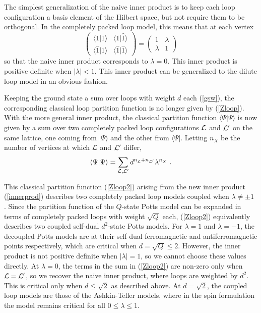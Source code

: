 \documentclass[11pt]{article}
\newcommand{\xxr}{|\widehat{1}\rangle}
\newcommand{\xxl}{\langle\widehat{1}}
\begin{document}
The simplest generalization of the naive inner product is to keep each
loop configuration a basis element of the Hilbert space, but not
require them to be orthogonal. In the completely packed loop model,
this means that at each vertex
\begin{equation}
\begin{pmatrix}
\langle 1|1\rangle & \langle 1\xxr \\
\xxl |1\rangle & 
 \xxl\xxr
\end{pmatrix}
=\begin{pmatrix}
1&\lambda\\
\lambda & 1
\end{pmatrix}
\label{innerprod}
\end{equation}
so that the naive inner product corresponds to
$\lambda=0$.   This inner product is positive definite
when $|\lambda|<1$.
This inner
product can be generalized to the dilute loop model in an obvious
fashion.

Keeping 
the ground state a sum over
loops with weight $d$ each  (\ref{gsw}), 
the corresponding classical loop partition function is no
longer given by (\ref{Zloop}).  With
the more general inner product, the classical partition function
$\langle \Psi | \Psi \rangle$ 
is now given by 
a sum over two completely packed loop configurations ${\cal L}$ and
${\cal L}'$ on the same lattice, one coming from $|\Psi\rangle$ and
the other from $\langle \Psi|$. Letting  $n_X^{}$ be the number of vertices
at which ${\cal L}$ and ${\cal L}'$ differ, 
\begin{equation}
\langle \Psi|\Psi\rangle 
=\sum_{{\cal L},{\cal L}'} d^{n^{}_{\cal L} +
 n_{{\cal L}'}} \lambda^{n_X^{}}\ .
\label{Zloop2}
\end{equation}

This classical partition function (\ref{Zloop2}) arising from the new inner
product (\ref{innerprod}) describes two completely packed loop models
coupled when $\lambda\ne \pm 1$ \cite{FJ}. Since the partition
function of the $Q$-state Potts model can be expanded in terms of
completely packed loops with weight $\sqrt{Q}$ each, (\ref{Zloop2})
equivalently describes two coupled self-dual $d^2$-state Potts
models. For $\lambda=1$ and $\lambda=-1$, the decoupled Potts models
are at their self-dual ferromagnetic and antiferromagnetic points
respectively, which are critical when $d=\sqrt{Q}\le 2$. However, the
inner product is not positive definite when $|\lambda|=1$, so we
cannot choose these values directly. At $\lambda=0$, the terms in the
sum in (\ref{Zloop2}) are non-zero only when ${\cal L}={\cal L}'$, so
we recover the naive inner product, where loops are weighted by
$d^2$. This is critical only when $d\le \sqrt{2}$ as described
above. At $d=\sqrt{2}$, the coupled loop models are those of the
Ashkin-Teller models, where in the spin formulation the model remains
critical for all $0\le \lambda \le 1$.
\end{document}
